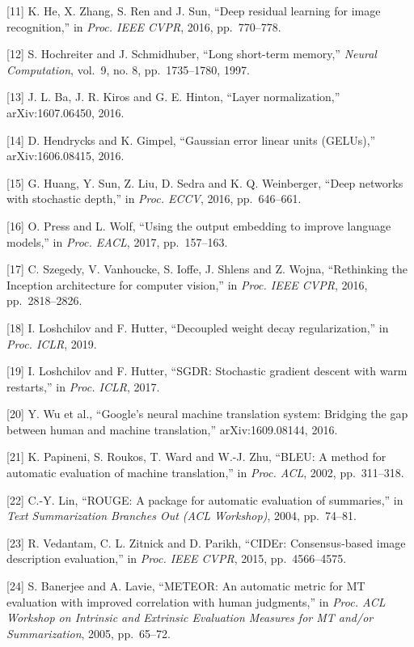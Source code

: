 {[}11{]} K. He, X. Zhang, S. Ren and J. Sun, ``Deep residual learning for image recognition,'' in \emph{Proc. IEEE CVPR}, 2016, pp.~770--778.

{[}12{]} S. Hochreiter and J. Schmidhuber, ``Long short-term memory,'' \emph{Neural Computation}, vol.~9, no. 8, pp.~1735--1780, 1997.

{[}13{]} J. L. Ba, J. R. Kiros and G. E. Hinton, ``Layer normalization,'' arXiv:1607.06450, 2016.

{[}14{]} D. Hendrycks and K. Gimpel, ``Gaussian error linear units (GELUs),'' arXiv:1606.08415, 2016.

{[}15{]} G. Huang, Y. Sun, Z. Liu, D. Sedra and K. Q. Weinberger, ``Deep networks with stochastic depth,'' in \emph{Proc. ECCV}, 2016, pp.~646--661.

{[}16{]} O. Press and L. Wolf, ``Using the output embedding to improve language models,'' in \emph{Proc. EACL}, 2017, pp.~157--163.

{[}17{]} C. Szegedy, V. Vanhoucke, S. Ioffe, J. Shlens and Z. Wojna, ``Rethinking the Inception architecture for computer vision,'' in \emph{Proc. IEEE CVPR}, 2016, pp.~2818--2826.

{[}18{]} I. Loshchilov and F. Hutter, ``Decoupled weight decay regularization,'' in \emph{Proc. ICLR}, 2019.

{[}19{]} I. Loshchilov and F. Hutter, ``SGDR: Stochastic gradient descent with warm restarts,'' in \emph{Proc. ICLR}, 2017.

{[}20{]} Y. Wu et al., ``Google's neural machine translation system: Bridging the gap between human and machine translation,'' arXiv:1609.08144, 2016.

{[}21{]} K. Papineni, S. Roukos, T. Ward and W.-J. Zhu, ``BLEU: A method for automatic evaluation of machine translation,'' in \emph{Proc. ACL}, 2002, pp.~311--318.

{[}22{]} C.-Y. Lin, ``ROUGE: A package for automatic evaluation of summaries,'' in \emph{Text Summarization Branches Out (ACL Workshop)}, 2004, pp.~74--81.

{[}23{]} R. Vedantam, C. L. Zitnick and D. Parikh, ``CIDEr: Consensus-based image description evaluation,'' in \emph{Proc. IEEE CVPR}, 2015, pp.~4566--4575.

{[}24{]} S. Banerjee and A. Lavie, ``METEOR: An automatic metric for MT evaluation with improved correlation with human judgments,'' in \emph{Proc. ACL Workshop on Intrinsic and Extrinsic Evaluation Measures for MT and/or Summarization}, 2005, pp.~65--72.

